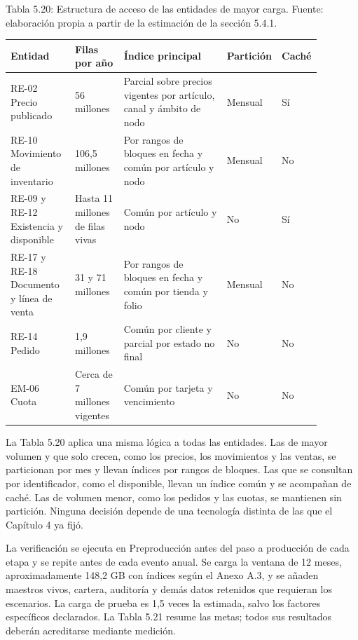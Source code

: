 \documentclass[11pt]{article}
\begin{document}
\par\vspace{0.6\baselineskip}\noindent\begin{minipage}{\linewidth}
Tabla 5.20: Estructura de acceso de las entidades de mayor carga. Fuente: elaboración propia a partir de la estimación de la sección 5.4.1.\label{tab:t25}\par\vspace{0.3\baselineskip}
\begin{tabular}{@{}p{0.210\linewidth}p{0.168\linewidth}p{0.368\linewidth}p{0.076\linewidth}p{0.055\linewidth}@{}}
\toprule Entidad & Filas por año & Índice principal & Partición & Caché \\
\midrule
RE-02 Precio publicado & 56 millones & Parcial sobre precios vigentes por artículo, canal y ámbito de nodo & Mensual & Sí \\
RE-10 Movimiento de inventario & 106,5 millones & Por rangos de bloques en fecha y común por artículo y nodo & Mensual & No \\
RE-09 y RE-12 Existencia y disponible & Hasta 11 millones de filas vivas & Común por artículo y nodo & No & Sí \\
RE-17 y RE-18 Documento y línea de venta & 31 y 71 millones & Por rangos de bloques en fecha y común por tienda y folio & Mensual & No \\
RE-14 Pedido & 1,9 millones & Común por cliente y parcial por estado no final & No & No \\
EM-06 Cuota & Cerca de 7 millones vigentes & Común por tarjeta y vencimiento & No & No \\
\bottomrule
\end{tabular}
\end{minipage}
\par


La Tabla 5.20 aplica una misma lógica a todas las entidades. Las de mayor volumen y que solo crecen, como los precios, los movimientos y las ventas, se particionan por mes y llevan índices por rangos de bloques. Las que se consultan por identificador, como el disponible, llevan un índice común y se acompañan de caché. Las de volumen menor, como los pedidos y las cuotas, se mantienen sin partición. Ninguna decisión depende de una tecnología distinta de las que el Capítulo 4 ya fijó.

La verificación se ejecuta en Preproducción antes del paso a producción de cada etapa y se repite antes de cada evento anual. Se carga la ventana de 12 meses, aproximadamente 148,2 GB con índices según el Anexo A.3, y se añaden maestros vivos, cartera, auditoría y demás datos retenidos que requieran los escenarios. La carga de prueba es 1,5 veces la estimada, salvo los factores específicos declarados. La Tabla 5.21 resume las metas; todos sus resultados deberán acreditarse mediante medición.
\end{document}
